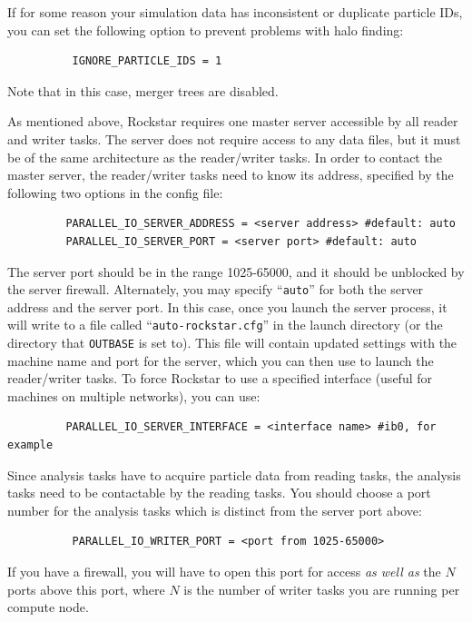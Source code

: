 \documentclass[12pt]{article}
\begin{document}
      If for some reason your simulation data has inconsistent or duplicate
      particle IDs, you can set the following option to prevent problems with
      halo finding:
\begin{verbatim}
          IGNORE_PARTICLE_IDS = 1
\end{verbatim}
      Note that in this case, merger trees are disabled.

      As mentioned above, Rockstar requires one master server accessible by
      all reader and writer tasks.  The server does not require access to any
      data files, but it must be of the same architecture as the reader/writer tasks.  In order to contact the master server, the reader/writer tasks need to know its address, specified by the following two
      options in the config file:
\begin{verbatim}
      	 PARALLEL_IO_SERVER_ADDRESS = <server address> #default: auto
      	 PARALLEL_IO_SERVER_PORT = <server port> #default: auto
\end{verbatim}
      The server port should be in the range 1025-65000, and it should be
      unblocked by the server firewall.  Alternately, you may specify
      ``\texttt{auto}'' for both the server address and the server port.  In this case,
      once you launch the server process, it will write to a file called
      ``\texttt{auto-rockstar.cfg}'' in the launch directory (or the directory that
      \texttt{OUTBASE} is set to).  This file will contain updated settings with
      the machine name and port for the server, which you can then use
      to launch the reader/writer tasks.  To force Rockstar to use a
      specified interface (useful for machines on multiple networks),
      you can use:
\begin{verbatim}
      	 PARALLEL_IO_SERVER_INTERFACE = <interface name> #ib0, for example
\end{verbatim}
      Since analysis tasks have to acquire particle data from reading tasks,
      the analysis tasks need to be contactable by the reading tasks.  You
      should choose a port number for the analysis tasks which is distinct
      from the server port above:
\begin{verbatim}
          PARALLEL_IO_WRITER_PORT = <port from 1025-65000>
\end{verbatim}
      If you have a firewall, you will have to open this port for access
      \textit{as well as} the $N$ ports above this port, where $N$ is the number of
      writer tasks you are running per compute node.
\end{document}
